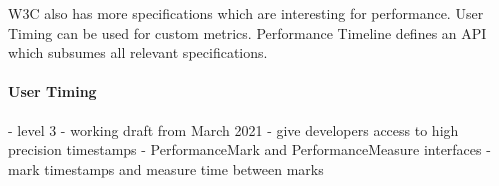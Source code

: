 






















W3C also has more specifications which are interesting for performance.
User Timing can be used for custom metrics.
Performance Timeline defines an API which subsumes all relevant specifications.


\paragraph{User Timing}


- level 3
- working draft from March 2021
- give developers access to high precision timestamps
- PerformanceMark and PerformanceMeasure interfaces
- mark timestamps and measure time between marks


